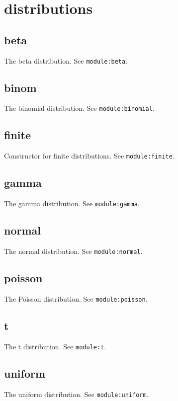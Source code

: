 \documentclass{article}
\begin{document}
  \section{distributions}
    \subsection*{beta}
    The beta distribution. See \texttt{module:beta}.


    \subsection*{binom}
    The binomial distribution. See \texttt{module:binomial}.


    \subsection*{finite}
    Constructor for finite distributions. See \texttt{module:finite}.


    \subsection*{gamma}
    The gamma distribution. See \texttt{module:gamma}.


    \subsection*{normal}
    The normal distribution. See \texttt{module:normal}.


    \subsection*{poisson}
    The Poisson distribution. See \texttt{module:poisson}.


    \subsection*{t}
    The t distribution. See \texttt{module:t}.


    \subsection*{uniform}
    The uniform distribution. See \texttt{module:uniform}.
\end{document}
